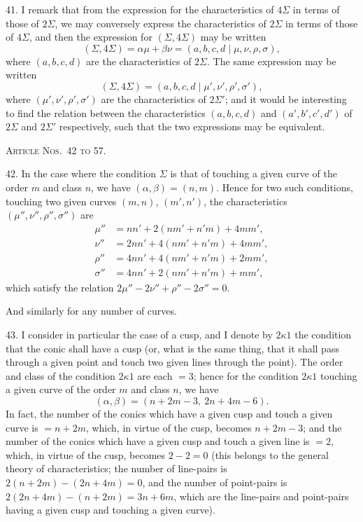 \documentclass[12pt,a4paper]{article}
\begin{document}
41. I remark that from the expression for the characteristics of $4\Sigma$ in terms of those of $2\Sigma$, we may conversely express the characteristics of $2\Sigma$ in terms of those of $4\Sigma$, and then the expression for $(\Sigma, 4\Sigma)$ may be written
\[
(\Sigma, 4\Sigma) = \alpha\mu + \beta\nu = (a, b, c, d \mid \mu, \nu, \rho, \sigma),
\]
where $(a, b, c, d)$ are the characteristics of $2\Sigma$. The same expression may be written
\[
(\Sigma, 4\Sigma) = (a, b, c, d \mid \mu', \nu', \rho', \sigma'),
\]
where $(\mu', \nu', \rho', \sigma')$ are the characteristics of $2\Sigma'$; and it would be interesting to find the relation between the characteristics $(a, b, c, d)$ and $(a', b', c', d')$ of $2\Sigma$ and $2\Sigma'$ respectively, such that the two expressions may be equivalent.

\bigskip
\noindent\textsc{Article Nos.~42 to 57.}

\smallskip

42. In the case where the condition $\Sigma$ is that of touching a given curve of the order $m$ and class $n$, we have $(\alpha, \beta) = (n, m)$. Hence for two such conditions, touching two given curves $(m, n)$, $(m', n')$, the characteristics $(\mu'', \nu'', \rho'', \sigma'')$ are
\begin{align*}
\mu'' &= nn' + 2(nm' + n'm) + 4mm',\\
\nu'' &= 2nn' + 4(nm' + n'm) + 4mm',\\
\rho'' &= 4nn' + 4(nm' + n'm) + 2mm',\\
\sigma'' &= 4nn' + 2(nm' + n'm) + mm',
\end{align*}
which satisfy the relation $2\mu'' - 2\nu'' + \rho'' - 2\sigma'' = 0$.

And similarly for any number of curves.

43. I consider in particular the case of a cusp, and I denote by $2\kappa 1$ the condition that the conic shall have a cusp (or, what is the same thing, that it shall pass through a given point and touch two given lines through the point). The order and class of the condition $2\kappa 1$ are each $= 3$; hence for the condition $2\kappa 1$ touching a given curve of the order $m$ and class $n$, we have
\[
(\alpha, \beta) = (n + 2m - 3,\ 2n + 4m - 6).
\]
In fact, the number of the conics which have a given cusp and touch a given curve is $= n + 2m$, which, in virtue of the cusp, becomes $n + 2m - 3$; and the number of the conics which have a given cusp and touch a given line is $= 2$, which, in virtue of the cusp, becomes $2 - 2 = 0$ (this belongs to the general theory of characteristics; the number of line-pairs is $2(n + 2m) - (2n + 4m) = 0$, and the number of point-pairs is $2(2n + 4m) - (n + 2m) = 3n + 6m$, which are the line-pairs and point-pairs having a given cusp and touching a given curve).
\end{document}
